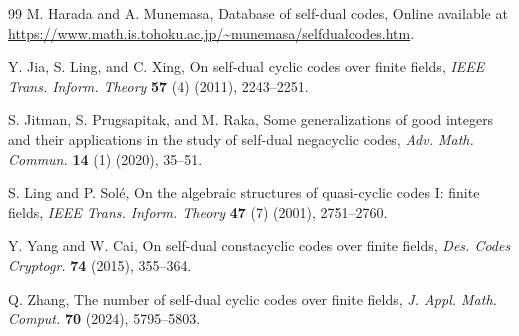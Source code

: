 \documentclass[12pt]{article}
\begin{document}
\begin{thebibliography}{99}
		 M. Harada and A. Munemasa, Database of self-dual codes, Online available at \url{https://www.math.is.tohoku.ac.jp/~munemasa/selfdualcodes.htm}.
		
		 Y. Jia, S. Ling, and C. Xing, On self-dual cyclic codes over finite fields, {\it IEEE Trans. Inform. Theory} {\bf 57} (4) (2011), 2243--2251.
		
		 S. Jitman, S. Prugsapitak, and M. Raka, Some generalizations of good integers and their applications in the study of self-dual negacyclic codes, {\it Adv. Math. Commun.} {\bf 14} (1) (2020), 35--51.
		
		 S. Ling and P. Sol\'e, On the algebraic structures of quasi-cyclic codes I: finite fields, {\it IEEE Trans. Inform. Theory} {\bf 47} (7) (2001), 2751--2760.
		
		 Y. Yang and W. Cai, On self-dual constacyclic codes over finite fields, {\it Des. Codes Cryptogr.} {\bf 74} (2015), 355--364.
		
		 Q. Zhang, The number of self-dual cyclic codes over finite fields, {\it J. Appl. Math. Comput.} {\bf 70} (2024), 5795--5803.
		
	\end{thebibliography}
	
\end{document}
